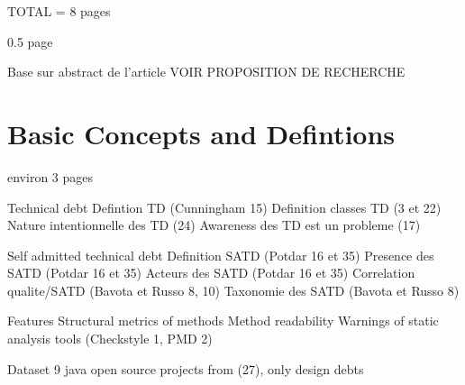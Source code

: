 
\label{sec:Introduction}  

TOTAL = 8 pages

0.5 page

Base sur abstract de l'article
VOIR PROPOSITION DE RECHERCHE




\section{Basic Concepts and Defintions}  

environ 3 pages

Technical debt
	Defintion TD (Cunningham 15)
	Definition classes TD (3 et 22)
	Nature intentionnelle des TD (24)
	Awareness des TD est un probleme (17)
	
Self admitted technical debt
	Definition SATD (Potdar 16 et 35)
	Presence des SATD (Potdar 16 et 35)
	Acteurs des SATD (Potdar 16 et 35)
	Correlation qualite/SATD (Bavota et Russo 8, 10)
	Taxonomie des SATD (Bavota et Russo 8)
	
Features
	Structural metrics of methods
	Method readability
	Warnings of static analysis tools (Checkstyle 1, PMD 2)	
	
Dataset
	9 java open source projects from (27), only design debts
	
